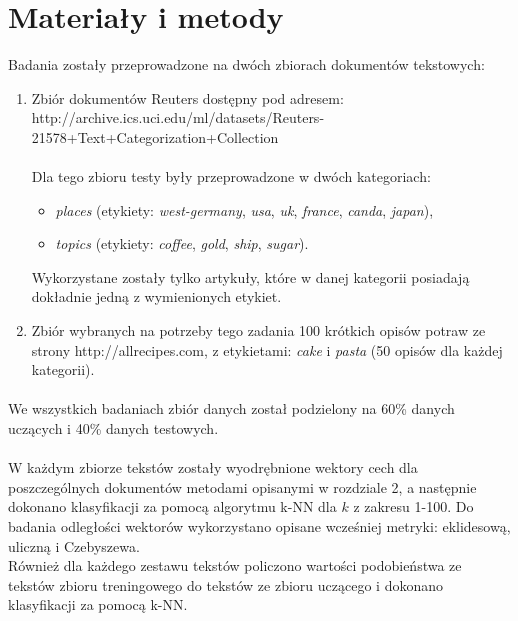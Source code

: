 \documentclass{classrep}
\begin{document}
\section{Materiały i metody}
Badania zostały przeprowadzone na dwóch zbiorach dokumentów tekstowych:\\
\begin{enumerate}
\item Zbiór dokumentów Reuters dostępny pod adresem:\\ http://archive.ics.uci.edu/ml/datasets/Reuters-21578+Text+Categorization+Collection\\\\
Dla tego zbioru testy były przeprowadzone w dwóch kategoriach:

\begin{itemize}
\item \textit{places} (etykiety: \textit{west-germany}, \textit{usa}, \textit{uk}, \textit{france}, \textit{canda}, \textit{japan}),
\item \textit{topics} (etykiety: \textit{coffee}, \textit{gold}, \textit{ship}, \textit{sugar}).\\
\end{itemize}
Wykorzystane zostały tylko artykuły, które w danej kategorii posiadają dokładnie jedną z wymienionych etykiet.\\


\item Zbiór wybranych na potrzeby tego zadania 100 krótkich opisów potraw ze strony http://allrecipes.com, z etykietami: \textit{cake} i \textit{pasta} (50 opisów dla każdej kategorii).

\end{enumerate}

\paragraph{}
We wszystkich badaniach zbiór danych został podzielony na 60\% danych uczących i 40\% danych testowych.
\paragraph{}
W każdym zbiorze tekstów zostały wyodrębnione wektory cech dla poszczególnych dokumentów metodami opisanymi w rozdziale 2, a następnie dokonano klasyfikacji za pomocą algorytmu k-NN dla $k$ z zakresu 1-100. Do badania odległości wektorów wykorzystano opisane wcześniej metryki: eklidesową, uliczną i Czebyszewa.\\
Również dla każdego zestawu tekstów policzono wartości podobieństwa ze tekstów zbioru treningowego do tekstów ze zbioru uczącego i dokonano klasyfikacji za pomocą k-NN.
\end{document}
